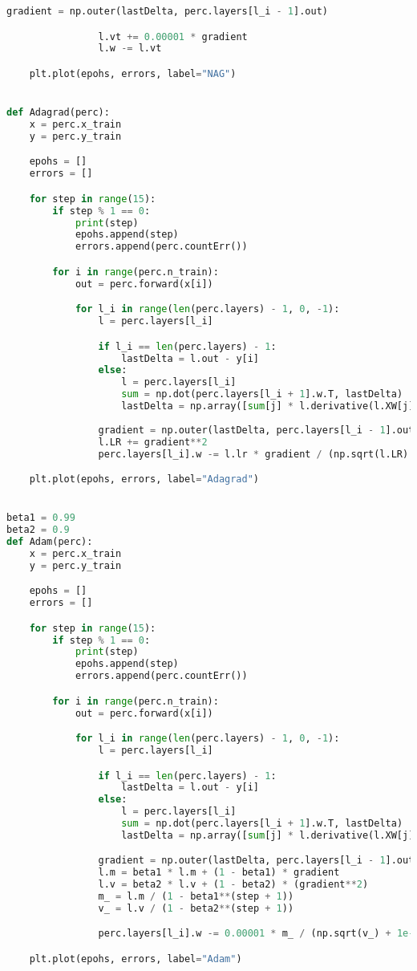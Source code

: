 \documentclass[a4paper, 14pt]{extarticle}
\begin{document}
\begin{lstlisting}[language=Python,caption={methods.py},label={lst:code2}]
                gradient = np.outer(lastDelta, perc.layers[l_i - 1].out)

                l.vt += 0.00001 * gradient
                l.w -= l.vt

    plt.plot(epohs, errors, label="NAG")


def Adagrad(perc):
    x = perc.x_train
    y = perc.y_train

    epohs = []
    errors = []

    for step in range(15):
        if step % 1 == 0:
            print(step)
            epohs.append(step)
            errors.append(perc.countErr())

        for i in range(perc.n_train):
            out = perc.forward(x[i])

            for l_i in range(len(perc.layers) - 1, 0, -1):
                l = perc.layers[l_i]

                if l_i == len(perc.layers) - 1:
                    lastDelta = l.out - y[i]
                else:
                    l = perc.layers[l_i]
                    sum = np.dot(perc.layers[l_i + 1].w.T, lastDelta)
                    lastDelta = np.array([sum[j] * l.derivative(l.XW[j]) for j in range(l.n_neurons)])
                    
                gradient = np.outer(lastDelta, perc.layers[l_i - 1].out)
                l.LR += gradient**2
                perc.layers[l_i].w -= l.lr * gradient / (np.sqrt(l.LR) + 1e-8)

    plt.plot(epohs, errors, label="Adagrad")


beta1 = 0.99
beta2 = 0.9
def Adam(perc):
    x = perc.x_train
    y = perc.y_train

    epohs = []
    errors = []

    for step in range(15):
        if step % 1 == 0:
            print(step)
            epohs.append(step)
            errors.append(perc.countErr())

        for i in range(perc.n_train):
            out = perc.forward(x[i])

            for l_i in range(len(perc.layers) - 1, 0, -1):
                l = perc.layers[l_i]

                if l_i == len(perc.layers) - 1:
                    lastDelta = l.out - y[i]
                else:
                    l = perc.layers[l_i]
                    sum = np.dot(perc.layers[l_i + 1].w.T, lastDelta)
                    lastDelta = np.array([sum[j] * l.derivative(l.XW[j]) for j in range(l.n_neurons)])

                gradient = np.outer(lastDelta, perc.layers[l_i - 1].out)
                l.m = beta1 * l.m + (1 - beta1) * gradient
                l.v = beta2 * l.v + (1 - beta2) * (gradient**2)
                m_ = l.m / (1 - beta1**(step + 1))
                v_ = l.v / (1 - beta2**(step + 1))

                perc.layers[l_i].w -= 0.00001 * m_ / (np.sqrt(v_) + 1e-8)

    plt.plot(epohs, errors, label="Adam")
\end{lstlisting}
\end{document}
